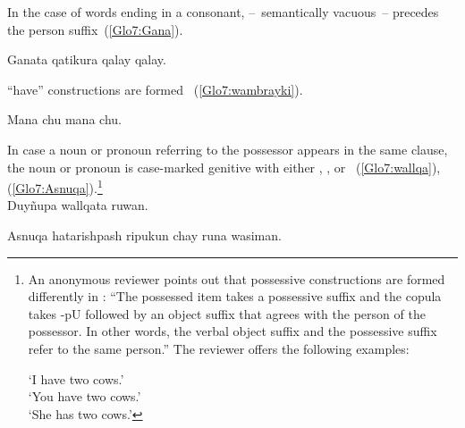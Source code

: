 \largerpage
\noindent
In the case of words ending in a consonant,  --~semantically vacuous~-- precedes the person suffix~(\ref{Glo7:Gana}).


%
{Ganata qatikura qalay qalay.}%
{}%
{}{}%

\noindent
\SYQ{} “have” constructions are formed  ~(\ref{Glo7:wambrayki}).


%
{Mana chu mana chu.}%
{}%
{}{}%

\noindent
In case a noun or pronoun referring to the possessor appears in the same clause, the noun or pronoun is case-marked genitive with either , , or ~(\ref{Glo7:wallqa}), (\ref{Glo7:Asnuqa}).\footnote{An anonymous reviewer points out that possessive constructions are formed differently in \QI{}: “The possessed item takes a possessive suffix and the copula takes -pU followed by an object suffix that agrees with the person of the possessor. In other words, the verbal object suffix and the possessive suffix refer to the same person.” The reviewer offers the following examples:

 ‘I have two cows.’\\
 ‘You have two cows.’\\
 ‘She has two cows.’}\\

%
{Duyñupa wallqata ruwan.}%
{}%
{}{}%

%
{Asnuqa hatarishpash ripukun chay runa wasiman.}%
{}%
{}{}%

